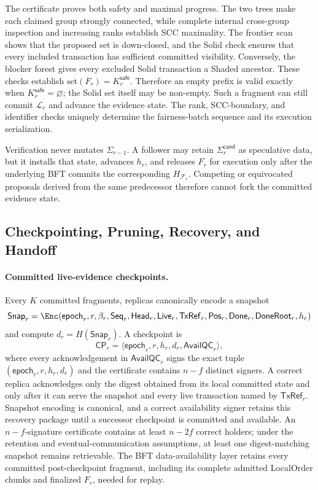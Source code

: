The certificate proves both safety and maximal progress.  The two trees make
each claimed group strongly connected, while complete internal cross-group
inspection and increasing ranks establish SCC maximality.  The frontier scan
shows that the proposed set is down-closed, and the Solid check ensures that
every included transaction has sufficient committed visibility.  Conversely,
the blocker forest gives every excluded Solid transaction a Shaded ancestor.
These checks establish
$\mathrm{set}(F_r)=K_r^{\mathsf{safe}}$.  Therefore an empty prefix is valid
exactly when $K_r^{\mathsf{safe}}=\varnothing$; the Solid set itself may be
non-empty.  Such a fragment can still commit $\mathcal L_r$ and advance the
evidence state.  The rank, SCC-boundary, and identifier checks uniquely
determine the fairness-batch sequence and its execution serialization.

Verification never mutates $\Sigma_{r-1}$.  A follower may retain
$\Sigma_r^{\mathsf{cand}}$ as speculative data, but it installs that state,
advances $h_r$, and releases $F_r$ for execution only after the underlying BFT
commits the corresponding $H_{\mathcal F_r}$.  Competing or equivocated
proposals derived from the same predecessor therefore cannot fork the
committed evidence state.

\subsection{Checkpointing, Pruning, Recovery, and Handoff}
\label{sec:checkpoint-recovery}

\paragraph{Committed live-evidence checkpoints.}
Every $K$ committed fragments, replicas canonically encode a snapshot
\[
 \mathsf{Snap}_r=\Enc(\mathsf{epoch}_r,r,\beta_r,\mathsf{Seq}_r,
 \mathsf{Head}_r,\mathsf{Live}_r,\mathsf{TxRef}_r,\mathsf{Pos}_r,
 \mathsf{Done}_r,\mathsf{DoneRoot}_r,h_r)
\]
and compute $d_r=H(\mathsf{Snap}_r)$.  A checkpoint is
\[
 \mathsf{CP}_r=\langle\mathsf{epoch}_r,r,h_r,d_r,
                       \mathsf{AvailQC}_r\rangle,
 \tag{14}\label{eq:checkpoint}
\]
where every acknowledgement in $\mathsf{AvailQC}_r$ signs the exact tuple
$(\mathsf{epoch}_r,r,h_r,d_r)$ and the certificate contains $n-f$ distinct
signers.  A correct replica acknowledges only the digest obtained from its
local committed state and only after it can serve the snapshot and every live
transaction named by $\mathsf{TxRef}_r$.  Snapshot encoding is canonical, and
a correct availability signer retains this recovery package until a successor
checkpoint is committed and available.
An $n-f$-signature certificate contains at least $n-2f$ correct holders;
under the retention and eventual-communication assumptions, at least one
digest-matching snapshot remains retrievable.  The BFT
data-availability layer retains every committed post-checkpoint fragment,
including its complete admitted LocalOrder chunks and finalized $F_r$, needed
for replay.

